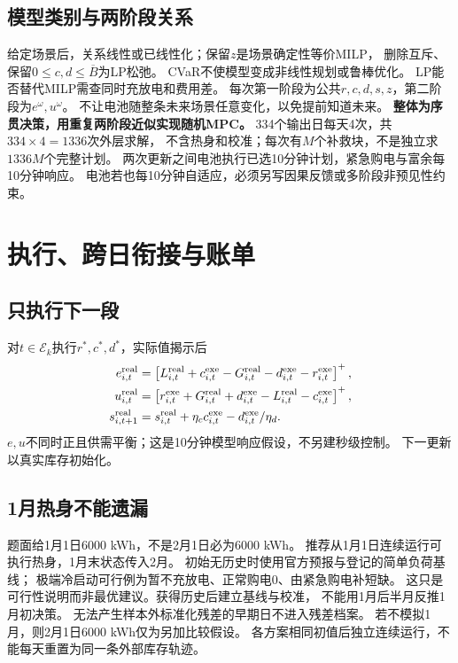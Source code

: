 \documentclass[UTF8,11pt]{ctexart}
\newcommand{\pos}[1]{\left[#1\right]^+}
\begin{document}
\subsection{模型类别与两阶段关系}
给定场景后，关系线性或已线性化；保留$z$是场景确定性等价MILP，
删除互斥、保留$0\leq c,d\leq\overline B$为LP松弛。
CVaR不使模型变成非线性规划或鲁棒优化。
LP能否替代MILP需查同时充放电和费用差。
每次第一阶段为公共$r,c,d,s,z$，第二阶段为$e^\omega,u^\omega$。
不让电池随整条未来场景任意变化，以免提前知道未来。
\textbf{整体为序贯决策，用重复两阶段近似实现随机MPC。}
334个输出日每天4次，共$334\times4=1336$次外层求解，
不含热身和校准；每次有$M$个补救块，不是独立求$1336M$个完整计划。
两次更新之间电池执行已选10分钟计划，紧急购电与富余每10分钟响应。
电池若也每10分钟自适应，必须另写因果反馈或多阶段非预见性约束。

\section{执行、跨日衔接与账单}
\subsection{只执行下一段}
对$t\in\mathcal E_k$执行$r^*,c^*,d^*$，实际值揭示后
\begin{align}
 e^{\rm real}_{i,t}
 &=\pos{L^{\rm real}_{i,t}+c^{\rm exe}_{i,t}
       -G^{\rm real}_{i,t}-d^{\rm exe}_{i,t}-r^{\rm exe}_{i,t}},\\
 u^{\rm real}_{i,t}
 &=\pos{r^{\rm exe}_{i,t}+G^{\rm real}_{i,t}+d^{\rm exe}_{i,t}
       -L^{\rm real}_{i,t}-c^{\rm exe}_{i,t}},\\
 s^{\rm real}_{i,t+1}
 &=s^{\rm real}_{i,t}+\eta_cc^{\rm exe}_{i,t}-d^{\rm exe}_{i,t}/\eta_d .
\end{align}
$e,u$不同时正且供需平衡；这是10分钟模型响应假设，不另建秒级控制。
下一更新以真实库存初始化。

\subsection{1月热身不能遗漏}
题面给1月1日6000 kWh，不是2月1日必为6000 kWh。
推荐从1月1日连续运行可执行热身，1月末状态传入2月。
初始无历史时使用官方预报与登记的简单负荷基线；
极端冷启动可行例为暂不充放电、正常购电0、由紧急购电补短缺。
这只是可行性说明而非最优建议。获得历史后建立基线与校准，
不能用1月后半月反推1月初决策。
无法产生样本外标准化残差的早期日不进入残差档案。
若不模拟1月，则2月1日6000 kWh仅为另加比较假设。
各方案相同初值后独立连续运行，不能每天重置为同一条外部库存轨迹。
\end{document}
